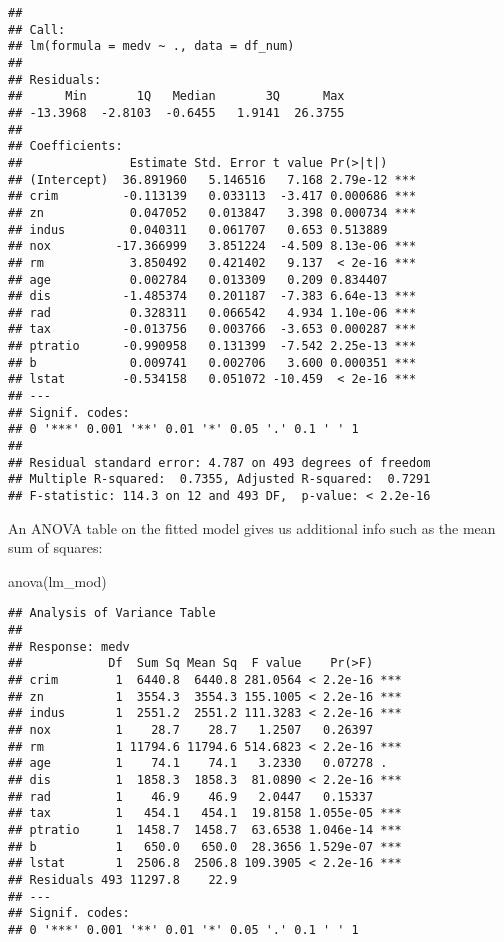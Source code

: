 \documentclass[
]{book}
\newenvironment{Shaded}{\begin{snugshade}}{\end{snugshade}}
\newcommand{\FunctionTok}[1]{\textcolor[rgb]{0.00,0.00,0.00}{#1}}
\newcommand{\NormalTok}[1]{#1}
\begin{document}
\begin{verbatim}
## 
## Call:
## lm(formula = medv ~ ., data = df_num)
## 
## Residuals:
##      Min       1Q   Median       3Q      Max 
## -13.3968  -2.8103  -0.6455   1.9141  26.3755 
## 
## Coefficients:
##               Estimate Std. Error t value Pr(>|t|)    
## (Intercept)  36.891960   5.146516   7.168 2.79e-12 ***
## crim         -0.113139   0.033113  -3.417 0.000686 ***
## zn            0.047052   0.013847   3.398 0.000734 ***
## indus         0.040311   0.061707   0.653 0.513889    
## nox         -17.366999   3.851224  -4.509 8.13e-06 ***
## rm            3.850492   0.421402   9.137  < 2e-16 ***
## age           0.002784   0.013309   0.209 0.834407    
## dis          -1.485374   0.201187  -7.383 6.64e-13 ***
## rad           0.328311   0.066542   4.934 1.10e-06 ***
## tax          -0.013756   0.003766  -3.653 0.000287 ***
## ptratio      -0.990958   0.131399  -7.542 2.25e-13 ***
## b             0.009741   0.002706   3.600 0.000351 ***
## lstat        -0.534158   0.051072 -10.459  < 2e-16 ***
## ---
## Signif. codes:  
## 0 '***' 0.001 '**' 0.01 '*' 0.05 '.' 0.1 ' ' 1
## 
## Residual standard error: 4.787 on 493 degrees of freedom
## Multiple R-squared:  0.7355, Adjusted R-squared:  0.7291 
## F-statistic: 114.3 on 12 and 493 DF,  p-value: < 2.2e-16
\end{verbatim}

An ANOVA table on the fitted model gives us additional info such as the mean sum of squares:

\begin{Shaded}
\begin{Highlighting}[]
\FunctionTok{anova}\NormalTok{(lm\_mod)}
\end{Highlighting}
\end{Shaded}

\begin{verbatim}
## Analysis of Variance Table
## 
## Response: medv
##            Df  Sum Sq Mean Sq  F value    Pr(>F)    
## crim        1  6440.8  6440.8 281.0564 < 2.2e-16 ***
## zn          1  3554.3  3554.3 155.1005 < 2.2e-16 ***
## indus       1  2551.2  2551.2 111.3283 < 2.2e-16 ***
## nox         1    28.7    28.7   1.2507   0.26397    
## rm          1 11794.6 11794.6 514.6823 < 2.2e-16 ***
## age         1    74.1    74.1   3.2330   0.07278 .  
## dis         1  1858.3  1858.3  81.0890 < 2.2e-16 ***
## rad         1    46.9    46.9   2.0447   0.15337    
## tax         1   454.1   454.1  19.8158 1.055e-05 ***
## ptratio     1  1458.7  1458.7  63.6538 1.046e-14 ***
## b           1   650.0   650.0  28.3656 1.529e-07 ***
## lstat       1  2506.8  2506.8 109.3905 < 2.2e-16 ***
## Residuals 493 11297.8    22.9                       
## ---
## Signif. codes:  
## 0 '***' 0.001 '**' 0.01 '*' 0.05 '.' 0.1 ' ' 1
\end{verbatim}
\end{document}
